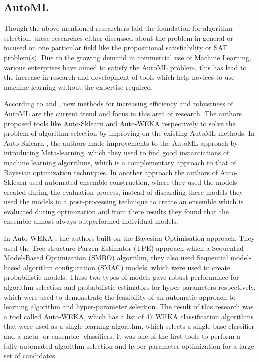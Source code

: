 \subsection*{AutoML}

Though the above mentioned researchers laid the foundation for algorithm selection, these researches either discussed about the problem in general or focused on one particular field like the propositional satisfiability or SAT problem(s). Due to the growing demand in commercial use of Machine Learning, various enterprises have aimed to satisfy the AutoML problem, this has lead to the increase in research and development of tools which help novices to use machine learning without the expertise required.

According to \citep{feurer:m} and \citep{kotthoff:l}, new methods for increasing efficiency and robustness of AutoML are the current trend and focus in this area of research. The authors proposed tools like Auto-Sklearn and Auto-WEKA respectively to solve the problem of algorithm selection by improving on the existing AutoML methods. In Auto-Sklearn \citep{feurer:m}, the authors made improvements to the AutoML approach by introducing Meta-learning, which they used to find good instantiations of machine learning algorithms, which is a complementary approach to that of Bayesian optimization techniques. In another approach the authors of Auto-Sklearn used automated ensemble construction, where they used the models created during the evaluation process, instead of discarding these models they used the models in a post-processing technique to create an ensemble which is evaluated during optimization and from there results they found that the ensemble almost always outperformed individual models. 

In Auto-WEKA \citep{kotthoff:l}, the authors built on the Bayesian Optimisation approach. They used the Tree-structure Parzen Estimator (TPE) approach which a Sequential Model-Based Optimization (SMBO) algorithm, they also used Sequential model-based algorithm configuration (SMAC) models, which were used to create probabilistic models. These two types of models gave robust performance for algorithm selection and probabilistic estimators for hyper-parameters respectively, which were used to demonstrate the feasibility of an automatic approach to learning algorithm and hyper-parameter selection. The result of this research was a tool called Auto-WEKA, which has a list of 47 WEKA classification algorithms that were used as a single learning algorithm, which selects a single base classifier and a meta- or ensemble- classifiers. It was one of the first tools to perform a fully automated algorithm selection and hyper-parameter optimization for a large set of candidates.


